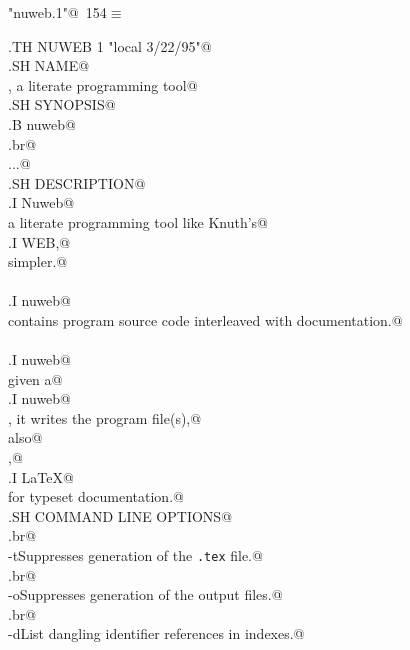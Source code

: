 \documentclass[a4paper]{report}
\begin{document}
\begin{flushleft} \small\label{scrap344}\raggedright\small
{} \verb@"nuweb.1"@\nobreak\ {\footnotesize {154}}$\equiv$
\vspace{-1ex}
\begin{list}{}{} \item
\mbox{}\verb@.TH NUWEB 1 "local 3/22/95"@\\
\mbox{}\verb@.SH NAME@\\
\mbox{}\verb@Nuweb, a literate programming tool@\\
\mbox{}\verb@.SH SYNOPSIS@\\
\mbox{}\verb@.B nuweb@\\
\mbox{}\verb@.br@\\
\mbox{}\verb@\fBnuweb\fP [options] [file] ...@\\
\mbox{}\verb@.SH DESCRIPTION@\\
\mbox{}\verb@.I Nuweb@\\
\mbox{}\verb@is a literate programming tool like Knuth's@\\
\mbox{}\verb@.I WEB,@\\
\mbox{}\verb@only simpler.@\\
\mbox{}\verb@A@\\
\mbox{}\verb@.I nuweb@\\
\mbox{}\verb@file contains program source code interleaved with documentation.@\\
\mbox{}\verb@When@\\
\mbox{}\verb@.I nuweb@\\
\mbox{}\verb@is given a@\\
\mbox{}\verb@.I nuweb@\\
\mbox{}\verb@file, it writes the program file(s),@\\
\mbox{}\verb@and also@\\
\mbox{}\verb@produces,@\\
\mbox{}\verb@.I LaTeX@\\
\mbox{}\verb@source for typeset documentation.@\\
\mbox{}\verb@.SH COMMAND LINE OPTIONS@\\
\mbox{}\verb@.br@\\
\mbox{}\verb@\fB-t\fP Suppresses generation of the {\tt .tex} file.@\\
\mbox{}\verb@.br@\\
\mbox{}\verb@\fB-o\fP Suppresses generation of the output files.@\\
\mbox{}\verb@.br@\\
\mbox{}\verb@\fB-d\fP List dangling identifier references in indexes.@\\

\end{list}
\end{flushleft}
\end{document}
